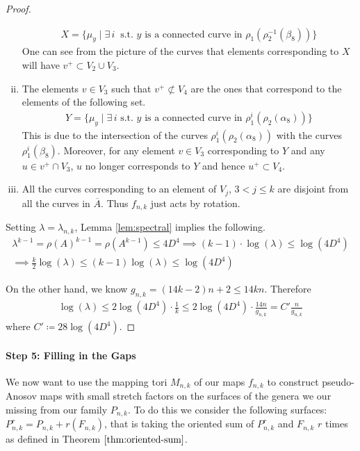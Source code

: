 \begin{proof}
\begin{enumerate}[(i)]
\begin{align*}
    X = \{\mu_y \mid \exists \,i\ \text{ s.t. $y$ is a connected curve in } \rho_1(\rho_2^{-1}(\beta_8))\}
  \end{align*}
  One can see from the picture of the curves that elements corresponding to $X$ will have
  $v^+ \subset V_2 \cup V_3$.
\item The elements $v \in V_3$ such that $v^+ \not\subset V_4$ are the ones that correspond to the elements of
  the following set.
  \begin{align*}
    Y = \{\mu_y \mid \exists \,i \text{ s.t. $y$ is a connected curve in } \rho_1^i(\rho_2(\alpha_8))\}
  \end{align*}
  This is due to the intersection of the curves $\rho_1^i(\rho_2(\alpha_8))$ with the curves
  $\rho_1^i(\beta_8)$. Moreover, for any element $v \in V_3$ corresponding to $Y$ and any
  $u \in v^+ \cap V_3$, $u$ no longer corresponds to $Y$ and hence $u^+ \subset V_4$.
\item All the curves corresponding to an element of $V_j$, $3 < j \leq k$ are disjoint from all the curves in
  $\overline{A}$. Thus $f_{n,k}$ just acts by rotation.
\end{enumerate}

Setting $\lambda = \lambda_{n,k}$, Lemma \ref{lem:spectral} implies the following.
\begin{gather*}
    \lambda^{k-1} = \rho(A)^{k-1} = \rho(A^{k-1}) \leq 4D^4 \implies (k-1)\cdot \log(\lambda) \leq \log(4D^4) \\
    \implies \frac{k}{2}\log(\lambda) \leq (k-1)\log(\lambda) \leq \log(4D^4)
\end{gather*}

On the other hand, we know $g_{n,k} = (14k - 2)n + 2 \leq 14kn$. Therefore
\begin{align*}
    \log(\lambda) \leq 2\log(4D^4)\cdot\frac{1}{k} \leq 2\log(4D^4)\cdot \frac{14n}{g_{n,k}} = C'\frac{n}{g_{n,k}}
\end{align*}
where $C' \coloneqq 28\log(4D^4)$.
\end{proof}

\paragraph{Step 5: Filling in the Gaps}

We now want to use the mapping tori $M_{n,k}$ of our maps $f_{n,k}$ to construct pseudo-Anosov maps with small
stretch factors on the surfaces of the genera we our missing from our family $P_{n,k}$. To do this we consider
the following surfaces: $P^r_{n,k} = P_{n,k} + r(F_{n,k})$, that is taking the oriented sum of $P^r_{n,k}$ and
$F_{n,k}$ $r$ times as defined in Theorem $\ref{thm:oriented-sum}$.

